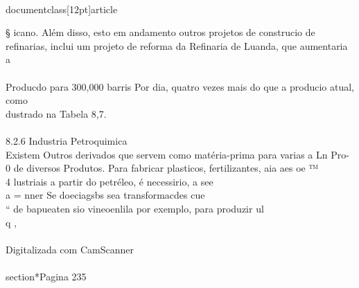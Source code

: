 \\documentclass[12pt]{article}
\begin{document}
§ icano. Além disso, esto em andamento outros projetos de construcio de\\
refinarias, inclui um projeto de reforma da Refinaria de Luanda, que aumentaria a\\
\\
Producdo para 300,000 barris Por dia, quatro vezes mais do que a producio atual, como\\
dustrado na Tabela 8,7.\\
\\
8.2.6 Industria Petroquimica\\
Existem Outros derivados que servem como matéria-prima para varias a Ln Pro-\\
0 de diversos Produtos. Para fabricar plasticos, fertilizantes, aia aes oe ™\\
4 lustriais a partir do petréleo, é necessirio, a see\\
a = nner Se doeciagsbs sea transformacdes cue\\
“ de bapueaten sio vineoenlila por exemplo, para produzir ul\\
q ,\\
\\
Digitalizada com CamScanner\\

\\section*{Pagina 235}
\end{document}

